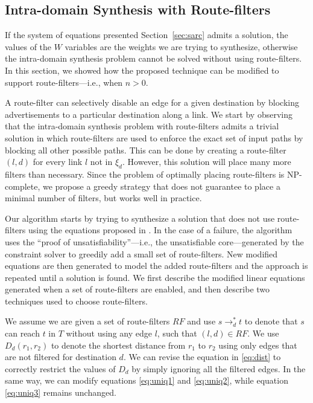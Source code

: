 \subsection{Intra-domain Synthesis with Route-filters} \label{sec:routefilter}

If the system of equations presented Section~\ref{sec:sarc} admits a solution, 
the values of the $W$ variables are the weights we are trying to synthesize,
otherwise the intra-domain synthesis problem cannot be solved without using route-filters.
In this section, we showed how the proposed technique can be modified
to support route-filters---i.e., when $n>0$.

A route-filter  can selectively disable an
edge for a given destination by  blocking advertisements to a
particular destination along a link.
We start by observing that the intra-domain synthesis problem with route-filters
admits a trivial solution in which 
route-filters are used to enforce the exact set of input paths by blocking all other possible paths.
This can be done by creating a 
route-filter $(l,d)$ for every link $l$ not in $\xi_d$. 
However, this solution will place many more filters than necessary.
Since the problem of optimally placing route-filters is NP-complete, 
we propose a greedy strategy that does not guarantee to place a minimal number of filters, but works well in practice.


Our algorithm starts by trying to synthesize a solution
that does not use route-filters using the equations proposed in . 
In the case of a failure, the algorithm uses the ``proof of unsatisfiability''---i.e., the unsatisfiable core---generated by 
the constraint solver 
to greedily add a small set of route-filters. 
New modified equations are then generated to model the added route-filters and the approach is repeated until a solution is found.
We first describe the 
modified linear equations generated when a set of
route-filters are enabled, and then describe two
techniques used to choose route-filters. 

We assume we are given a set of route-filters $RF$ and 
use $s\rightarrow_d^* t$ to denote that $s$ can reach $t$
in $T$ without using any edge $l$, such that $(l,d)\in RF$.
We use $D_d(r_1, r_2)$ to denote the shortest distance from $r_1$ to $r_2$
using only edges that are not filtered for destination $d$.
We can revise the equation in \eqref{eq:dist} to correctly restrict the values of $D_d$
by simply ignoring all the filtered edges. 
In the same way, we can modify equations  \eqref{eq:uniq1} and \eqref{eq:uniq2}, while
equation \eqref{eq:uniq3} remains unchanged.

